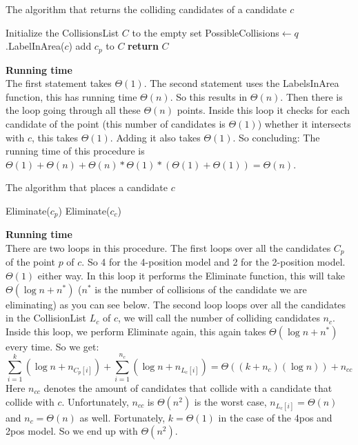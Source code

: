 \documentclass[crop=false,a4paper,oneside,11pt]{article}
\begin{document}
\begin{algorithm}[H]
\caption{The algorithm that returns the colliding candidates of a candidate $c$}
\begin{algorithmic}[1]
\State Initialize the CollisionsList $C$ to the empty set
\State PossibleCollisions$\gets q$.LabelInArea($c$)
\State add $c_p$ to $C$
\EndIf
\EndFor
\EndFor
\State \textbf{return} $C$
\EndProcedure
\end{algorithmic}
\end{algorithm}
\textbf{Running time}\\
The first statement takes $\Theta(1)$. The second statement uses the LabelsInArea function, this has running time $\Theta(n)$. So this results in $\Theta(n)$. Then there is the loop going through all these $\Theta(n)$ points. Inside this loop it checks for each candidate of the point (this number of candidates is $\Theta(1)$) whether it intersects with $c$, this takes $\Theta(1)$. Adding it also takes $\Theta(1)$. So concluding: The running time of this procedure is $\Theta(1)+\Theta(n)+\Theta(n)*\Theta(1)*(\Theta(1)+\Theta(1))=\Theta(n)$.

\begin{algorithm}[H]
\caption{The algorithm that places a candidate $c$}
\begin{algorithmic}[1]
\State Eliminate($c_p$)
\EndFor
{}
\State Eliminate($c_c$)
\EndFor
\EndProcedure
\end{algorithmic}
\end{algorithm}
\textbf{Running time}\\
There are two loops in this procedure. The first loops over all the candidates $C_p$ of the point $p$ of $c$. So 4 for the 4-position model and 2 for the 2-position model. $\Theta(1)$ either way. In this loop it performs the Eliminate function, this will take $\Theta(\log n + n^*)$ ($n^*$ is the number of collisions of the candidate we are eliminating) as you can see below. The second loop loops over all the candidates in the CollisionList $L_c$ of $c$, we will call the number of colliding candidates $n_c$. Inside this loop, we perform Eliminate again, this again takes $\Theta(\log n + n^*)$ every time. So we get:
$$\sum\limits_{i=1}^k(\log n + n_{C_p[i]})+\sum\limits_{i=1}^{n_c}(\log n + n_{L_c[i]})=\Theta((k+n_c)(\log n))+n_{cc}$$
Here $n_{cc}$ denotes the amount of candidates that collide with a candidate that collide with $c$. Unfortunately, $n_{cc}$ is $\Theta(n^2)$ is the worst case, $n_{L_c[i]}=\Theta(n)$ and $n_c=\Theta(n)$ as well. Fortunately, $k=\Theta(1)$ in the case of the 4pos and 2pos model. So we end up with $\Theta(n^2)$.
\end{document}
